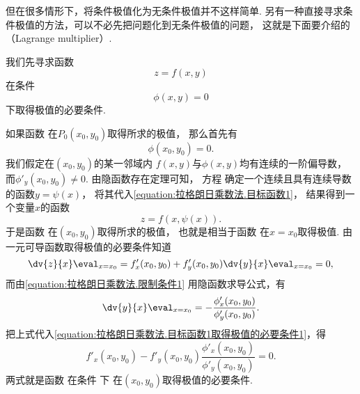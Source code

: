 但在很多情形下，将条件极值化为无条件极值并不这样简单.
另有一种直接寻求条件极值的方法，可以不必先把问题化到无条件极值的问题，
这就是下面要介绍的（Lagrange multiplier）.

我们先寻求函数
\begin{equation}\label{equation:拉格朗日乘数法.目标函数1}
	z=f(x,y)
\end{equation}
在条件
\begin{equation}\label{equation:拉格朗日乘数法.限制条件1}
	\phi(x,y)=0
\end{equation}
下取得极值的必要条件.

如果函数 
在\(P_0(x_0,y_0)\)取得所求的极值，
那么首先有
\begin{equation}\label{equation:拉格朗日乘数法.限制条件1在P0}
	\phi(x_0,y_0)=0.
\end{equation}
我们假定在\((x_0,y_0)\)的某一邻域内
\(f(x,y)\)与\(\phi(x,y)\)均有连续的一阶偏导数，
而\(\phi'_y(x_0,y_0)\neq0\).
由隐函数存在定理可知，
方程 
确定一个连续且具有连续导数的函数\(y=\psi(x)\)，
将其代入\cref{equation:拉格朗日乘数法.目标函数1}，
结果得到一个变量\(x\)的函数
\begin{equation}\label{equation:拉格朗日乘数法.目标函数1.代入限制条件1}
	z=f(x,\psi(x)).
\end{equation}
于是函数  在\((x_0,y_0)\)取得所求的极值，
也就是相当于函数  在\(x=x_0\)取得极值.
由一元可导函数取得极值的必要条件知道
\begin{equation}\label{equation:拉格朗日乘数法.目标函数1取得极值的必要条件1}
	\dv{z}{x}\eval_{x=x_0}
	= f'_x(x_0,y_0) + f'_y(x_0,y_0) \dv{y}{x}\eval_{x=x_0}
	= 0,
\end{equation}
而由\cref{equation:拉格朗日乘数法.限制条件1} 用隐函数求导公式，有\begin{equation*}
	\dv{y}{x}\eval_{x=x_0}
	= -\frac{\phi'_x(x_0,y_0)}{\phi'_y(x_0,y_0)}.
\end{equation*}
把上式代入\cref{equation:拉格朗日乘数法.目标函数1取得极值的必要条件1}，得
\begin{equation}\label{equation:拉格朗日乘数法.目标函数1取得极值的必要条件2}
	f'_x(x_0,y_0) - f'_y(x_0,y_0) \frac{\phi'_x(x_0,y_0)}{\phi'_y(x_0,y_0)}
	= 0.
\end{equation}
两式就是函数 
在条件  下
在\((x_0,y_0)\)取得极值的必要条件.

